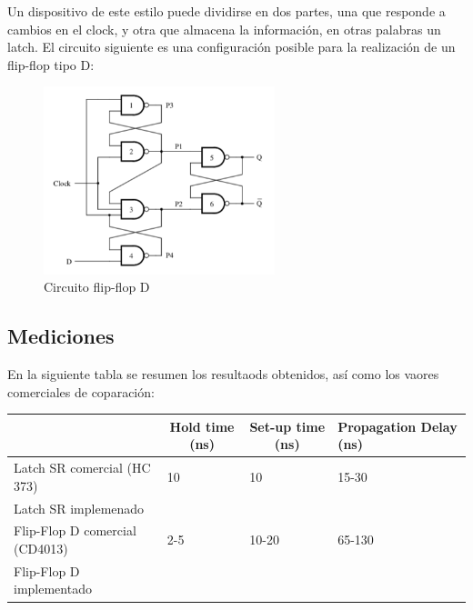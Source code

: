 Un dispositivo de este estilo puede dividirse en dos partes, una que responde a cambios en el clock, y otra que almacena la información, en otras palabras un latch. El circuito siguiente es una configuración posible para la realización de un flip-flop tipo D:

\begin{figure}[H]
	\centering
	\includegraphics[width=0.6\textwidth]{Ejercicio6/Recursos/flipflopDcircuito}
	\caption{Circuito flip-flop D}
\end{figure}

\subsection{Mediciones}

En la siguiente tabla se resumen los resultaods obtenidos, as\'i como los vaores comerciales de coparaci\'on:

\begin{table}[H]
\begin{tabular}{llll}\hline
\multicolumn{1}{c}{}           & \multicolumn{1}{c}{Hold time (ns)} & \multicolumn{1}{c}{Set-up time (ns)} & Propagation Delay (ns) \\
\hline
Latch SR comercial (HC 373)    & 10                                 & 10                                   & 15-30                  \\
Latch SR implemenado           &                                    &                                      &                        \\
Flip-Flop D comercial (CD4013) & 2-5                                & 10-20                                & 65-130                 \\
Flip-Flop D implementado       &                                    &                                      &                        \\  \hline
\end{tabular}
\end{table}
